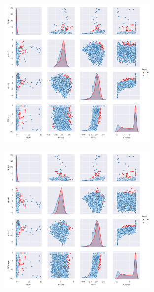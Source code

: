 \begin{figure}[h]
\centering
\includegraphics[width=0.7\textwidth]{output/figure_13.png}
\end{figure}
\begin{figure}[h]
\centering
\includegraphics[width=0.7\textwidth]{output/figure_14.png}
\end{figure}






